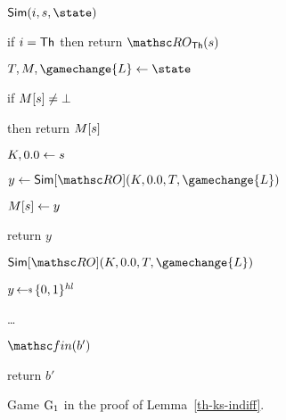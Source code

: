 \begin{figure}[tp]
	\begin{minipage}[t]{0.46\textwidth}
		\NewExperiment[Games $\Gm_1$]
	
			\begin{oracle}{$\Sim(\simIndex,\simInString,\state)$}
			\item if $i=\mathsf{Th}$ then return $\ROthash(\simInString)$
			\item $\rlookuptable, \cachetable, \gamechange{L} \gets \state$
			\item if $M[s] \neq \bot$
			\item \quad then return $M[s]$
			\item $\hmackey,\hmactext \gets \simInString$
			\item $\simOut \gets \simulator[\RO](\hmackey, \hmactext,\rlookuptable, \gamechange{L})$
			\item $M[s] \gets y$
			\item {}
			\item return $y$
		\end{oracle}
	\end{minipage}
	\begin{minipage}[t]{0.49\textwidth}
			\ExptSepSpace
		\begin{oracle}{$\Sim[\RO](\hmackey, \hmactext, \rlookuptable,\gamechange{L})$}
			\item $\simOut \getsr \bits^{\hashlen}$
			\item {}
			\item \quad {}
			\item[] \ldots
		\end{oracle}
	\ExptSepSpace
	\begin{algorithm}{$\Finalize(b')$}
		\item {}
		\item return $b'$
	\end{algorithm}
	\end{minipage}
	\label{fig:gm1-ks-indiff}
	\caption{ Game $\Gm_1$ in the proof of Lemma~\ref{th-ks-indiff}. }
\end{figure}

